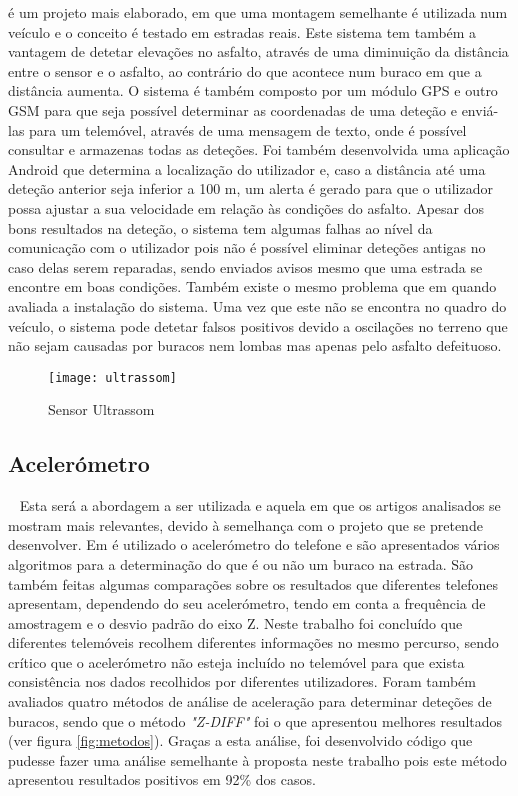 \cite{Madli2015} é um projeto mais elaborado, em que uma montagem semelhante é utilizada num veículo e o conceito é testado em estradas reais.
Este sistema tem também a vantagem de detetar elevações no asfalto, através de uma diminuição da distância entre o sensor e o asfalto, ao contrário do que acontece num buraco em que a distância aumenta.
O sistema é também composto por um módulo GPS e outro GSM para que seja possível determinar as coordenadas de uma deteção e enviá-las para um telemóvel, através de uma mensagem de texto, onde é possível consultar e armazenas todas as deteções.
Foi também desenvolvida uma aplicação Android que determina a localização do utilizador e, caso a distância até uma deteção anterior seja inferior a 100 m, um alerta é gerado para que o utilizador possa ajustar a sua velocidade em relação às condições do asfalto.
Apesar dos bons resultados na deteção, o sistema tem algumas falhas ao nível da comunicação com o utilizador pois não é possível eliminar deteções antigas no caso delas serem reparadas, sendo enviados avisos mesmo que uma estrada se encontre em boas condições.
Também existe o mesmo problema que em \cite{Hegde2015} quando avaliada a instalação do sistema. Uma vez que este não se encontra no quadro do veículo, o sistema pode detetar falsos positivos devido a oscilações no terreno que não sejam causadas por buracos nem lombas mas apenas pelo asfalto defeituoso.

\begin{figure}[hbtp]
	\centering
	\texttt{[image: ultrassom]}
	\caption[Sensor Ultrassom]{Sensor Ultrassom \footnotemark}
	\label{fig:sensor_ultrassom}
\end{figure}


\subsection{Acelerómetro}\
\label{subsec: acelerometro}
Esta será a abordagem a ser utilizada e aquela em que os artigos analisados se mostram mais relevantes, devido à semelhança com o projeto que se pretende desenvolver. Em \cite{Mednis2011} é utilizado o acelerómetro do telefone e são apresentados vários algoritmos para a determinação do que é ou não um buraco na estrada. São também feitas algumas comparações sobre os resultados que diferentes telefones apresentam, dependendo do seu acelerómetro, tendo em conta a frequência de amostragem e o desvio padrão do eixo Z.
Neste trabalho foi concluído que diferentes telemóveis recolhem diferentes informações no mesmo percurso, sendo crítico que o acelerómetro não esteja incluído no telemóvel para que exista consistência nos dados recolhidos por diferentes utilizadores.
Foram também avaliados quatro métodos de análise de aceleração para determinar deteções de buracos, sendo que o método \emph{"Z-DIFF"} foi o que apresentou melhores resultados (ver figura \ref{fig:metodos}).
Graças a esta análise, foi desenvolvido código que pudesse fazer uma análise semelhante à proposta neste trabalho pois este método apresentou resultados positivos em 92\% dos casos.

